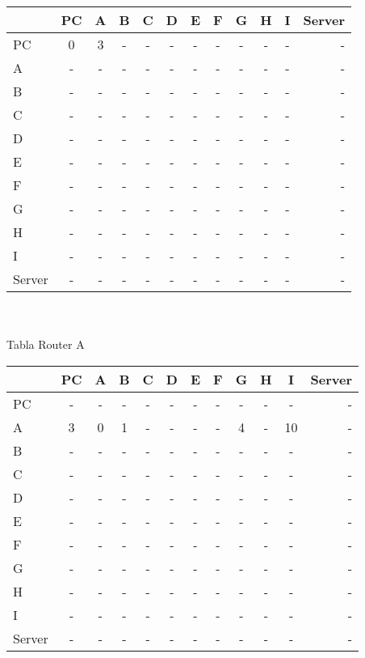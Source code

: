 \documentclass{article}
\begin{document}
\begin{tabular}{l*{10}{c}r}
              & PC & A & B & C & D & E & F  & G & H & I & Server \\
\hline
PC             & 0 & 3 & - & - & - & - & - & - & - & - & - \\
A              & - & - & - & - & - & - & - & - & - & - & - \\
B              & - & - & - & - & - & - & - & - & - & - & - \\
C              & - & - & - & - & - & - & - & - & - & - & - \\
D              & - & - & - & - & - & - & - & - & - & - & - \\
E              & - & - & - & - & - & - & - & - & - & - & - \\
F              & - & - & - & - & - & - & - & - & - & - & - \\
G              & - & - & - & - & - & - & - & - & - & - & - \\
H              & - & - & - & - & - & - & - & - & - & - & - \\
I              & - & - & - & - & - & - & - & - & - & - & - \\
Server         & - & - & - & - & - & - & - & - & - & - & - \\	

\end{tabular}
\\
\\
Tabla Router A  \\
\begin{tabular}{l*{10}{c}r}
              & PC & A & B & C & D & E & F & G & H & I & Server \\
\hline
PC             & - & - & - & - & - & - & - & - & - & - & -\\
A              & 3 & 0 & 1 & - & - & - & - & 4 & - & 10 & -\\
B              & - & - & - & - & - & - & - & - & - & - & -\\
C              & - & - & - & - & - & - & - & - & - & - & -\\
D              & - & - & - & - & - & - & - & - & - & - & -\\
E              & - & - & - & - & - & - & - & - & - & - & -\\
F              & - & - & - & - & - & - & - & - & - & - & -\\
G              & - & - & - & - & - & - & - & - & - & - & -\\
H              & - & - & - & - & - & - & - & - & - & - & -\\
I              & - & - & - & - & - & - & - & - & - & - & -\\
Server         & - & - & - & - & - & - & - & - & - & - & -\\

\end{tabular}
\end{document}
